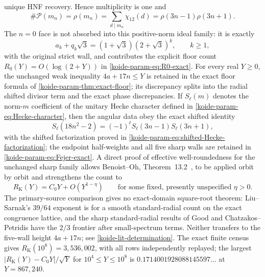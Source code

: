 \begin{enumerate}[leftmargin=1.8em,itemsep=.65em]
unique HNF recovery.  Hence multiplicity is one and
\[
 \#\mathcal P(m_n)=\rho(m_n)
 =\sum_{d\mid m_n}\chi_{12}(d)
 =\rho(3n-1)\rho(3n+1).
\]
The \(n=0\) face is not absorbed into this positive-norm ideal family: it is
exactly
\[
 a_k+q_k\sqrt3=(1+\sqrt3)(2+\sqrt3)^k,\qquad k\geq1,
\]
with the original strict wall, and contributes the explicit floor count
\(R_0(Y)=O(\log(2+Y))\) in \cref{koide-param-eq:R0-exact}.
For every real \(Y\geq0\), the unchanged weak inequality
\(4a+17n\leq Y\) is retained in the exact floor formula of
\cref{koide-param-thm:exact-floor}; its discrepancy splits into the radial
shifted divisor term and the exact phase discrepancies.  If
\(S_\ell(m)\) denotes the norm-\(m\) coefficient of the unitary Hecke
character defined in \cref{koide-param-eq:Hecke-character}, then the angular
data obey the exact shifted identity
\[
 S_\ell(18n^2-2)
 =(-1)^\ell S_\ell(3n-1)S_\ell(3n+1),
\]
with the shifted factorization proved in
\cref{koide-param-eq:shifted-Hecke-factorization}; the endpoint half-weights
and all five sharp walls are retained in
\cref{koide-param-eq:Fejer-exact}.
A direct proof of effective well-roundedness for the unchanged sharp family
allows Benoist--Oh, Theorem~13.2~\cite[pp.~1931--1932]{BenoistOh_2012},
to be applied orbit by orbit and strengthens
the count to
\[
 \boxed{R_{\mathrm K}(Y)=C_0Y+O(Y^{1-\eta})}
 \qquad\text{for some fixed, presently unspecified }\eta>0.
\]
The primary-source comparison gives no exact-domain square-root theorem:
Liu--Sarnak's \(39/64\) exponent is for a smooth standard-radial count on
the exact congruence lattice, and the sharp standard-radial results of Good
and Chatzakos--Petridis have the \(2/3\) frontier after small-spectrum terms.
Neither transfers to the five-wall height \(4a+17n\); see
\cref{koide-lit-determination}.
The exact finite census gives
\(R_{\mathrm K}(10^8)=3{,}536{,}002\), with all rows independently replayed;
the largest \(\lvert R_{\mathrm K}(Y)-C_0Y\rvert/\sqrt Y\) for
\(10^4\leq Y\leq10^8\) is
\(0.1714001928088145597\ldots\) at \(Y=867{,}240\).


\end{enumerate}
